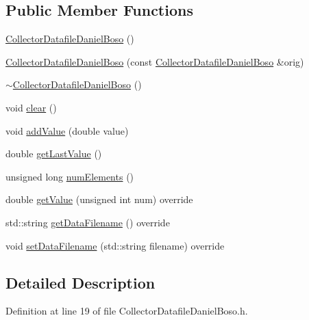 \subsection*{Public Member Functions}
\begin{DoxyCompactItemize}
\item 
\hyperlink{class_collector_datafile_daniel_boso_a42686f430246011398e9aea7d1bf4c41}{Collector\-Datafile\-Daniel\-Boso} ()
\item 
\hyperlink{class_collector_datafile_daniel_boso_a2c142627d301f10eda924f46a6e2cfed}{Collector\-Datafile\-Daniel\-Boso} (const \hyperlink{class_collector_datafile_daniel_boso}{Collector\-Datafile\-Daniel\-Boso} \&orig)
\item 
\hyperlink{class_collector_datafile_daniel_boso_a468345766229b40143cef5cd531be7e9}{$\sim$\-Collector\-Datafile\-Daniel\-Boso} ()
\item 
void \hyperlink{class_collector_datafile_daniel_boso_af3079af596315a0db7f9b61eeb9d351e}{clear} ()
\item 
void \hyperlink{class_collector_datafile_daniel_boso_aee2cf75e9664d3f155359f9e723ed687}{add\-Value} (double value)
\item 
double \hyperlink{class_collector_datafile_daniel_boso_a526f6c68c3bc5e6c4d2b9ffa2cef4521}{get\-Last\-Value} ()
\item 
unsigned long \hyperlink{class_collector_datafile_daniel_boso_a6b5dd4519616a6c0a55f1eb929dd55d6}{num\-Elements} ()
\item 
double \hyperlink{class_collector_datafile_daniel_boso_a86065f1aedd10467a44f499c562adbc3}{get\-Value} (unsigned int num) override
\item 
std\-::string \hyperlink{class_collector_datafile_daniel_boso_ab56f9c991ace07612d13e3ea610afe04}{get\-Data\-Filename} () override
\item 
void \hyperlink{class_collector_datafile_daniel_boso_aa1d0368a39fe4b2656fff1cd58f700df}{set\-Data\-Filename} (std\-::string filename) override
\end{DoxyCompactItemize}


\subsection{Detailed Description}


Definition at line 19 of file Collector\-Datafile\-Daniel\-Boso.\-h.




